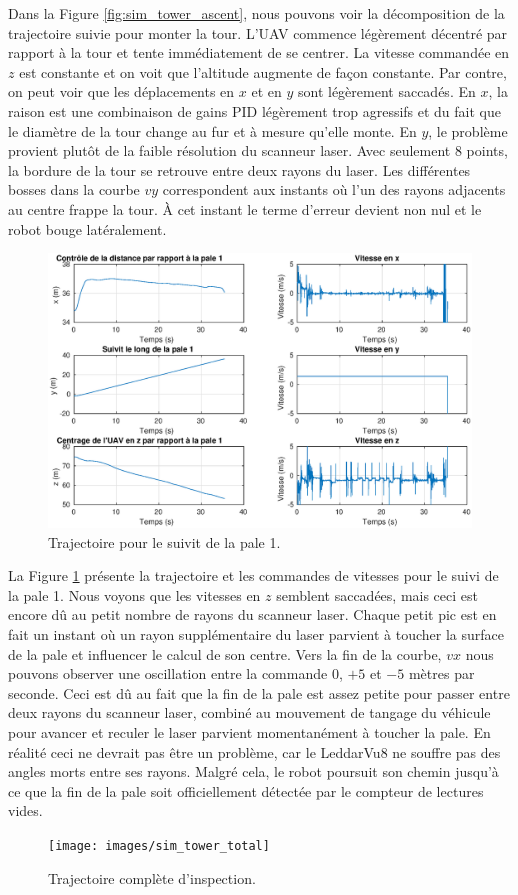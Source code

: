 Dans la Figure \ref{fig:sim_tower_ascent}, nous pouvons voir la décomposition de la trajectoire suivie pour monter la tour. L'UAV commence légèrement décentré par rapport à la tour et tente immédiatement de se centrer. La vitesse commandée en $z$ est constante et on voit que l'altitude augmente de façon constante. Par contre, on peut voir que les déplacements en $x$ et en $y$ sont légèrement saccadés. En $x$, la raison est une combinaison de gains PID légèrement trop agressifs et du fait que le diamètre de la tour change au fur et à mesure qu'elle monte. En $y$, le problème provient plutôt de la faible résolution du scanneur laser. Avec seulement $8$ points, la bordure de la tour se retrouve entre deux rayons du laser. Les différentes bosses dans la courbe $vy$ correspondent aux instants où l'un des rayons adjacents au centre frappe la tour. À cet instant le terme d'erreur devient non nul et le robot bouge latéralement.
\begin{figure}[htb]
  \centering
  \includegraphics[trim=30 20 30 0, clip, width=\linewidth]{images/sim_suivit_pale}
  \caption{Trajectoire pour le suivit de la pale 1.}
  \label{fig:sim_suivit_pale}
\end{figure}

La Figure \ref{fig:sim_suivit_pale} présente la trajectoire et les commandes de vitesses pour le suivi de la pale 1. Nous voyons que les vitesses en $z$ semblent saccadées, mais ceci est encore dû au petit nombre de rayons du scanneur laser. Chaque petit pic est en fait un instant où un rayon supplémentaire du laser parvient à toucher la surface de la pale et influencer le calcul de son centre. Vers la fin de la courbe, $vx$ nous pouvons observer une oscillation entre la commande $0$, $+5$ et $-5$ mètres par seconde. Ceci est dû au fait que la fin de la pale est assez petite pour passer entre deux rayons du scanneur laser, combiné au mouvement de tangage du véhicule pour avancer et reculer le laser parvient momentanément à toucher la pale. En réalité ceci ne devrait pas être un problème, car le LeddarVu8 ne souffre pas des angles morts entre ses rayons. Malgré cela, le robot poursuit son chemin jusqu'à ce que la fin de la pale soit officiellement détectée par le compteur de lectures vides.
\begin{figure}[htb]
  \centering
  \texttt{[image: images/sim\_tower\_total]}
  \caption{Trajectoire complète d'inspection.}
  \label{fig:sim_tower_total}
\end{figure}

